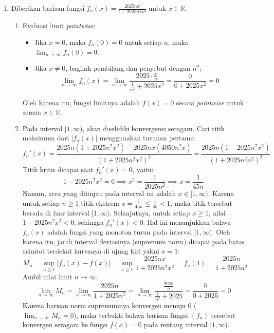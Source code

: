 \documentclass[11pt,letterpaper]{article}
\begin{document}
\begin{enumerate}
  \item Diberikan barisan fungsi $f_n(x) = \frac{2025nx}{1+2025n^2x^2}$ untuk $x \in \mathbb{R}$.
        \begin{enumerate}[label=\alph*)]
          \item Evaluasi limit \textit{pointwise}:
                \begin{itemize}
                  \item Jika $x = 0$, maka $f_n(0) = 0$ untuk setiap $n$, maka $\lim_{n \to \infty} f_n(0) = 0$.
                  \item Jika $x \neq 0$, bagilah pembilang dan penyebut dengan $n^2$:
                        \[ \lim_{n \to \infty} f_n(x) = \lim_{n \to \infty} \frac{2025 \cdot \frac{x}{n}}{\frac{1}{n^2} + 2025x^2} = \frac{0}{0 + 2025x^2} = 0 \]
                \end{itemize}
                Oleh karena itu, fungsi limitnya adalah $f(x) = 0$ secara \textit{pointwise} untuk semua $x \in \mathbb{R}$.
          \item Pada interval $[1, \infty)$, akan diselidiki konvergensi seragam.
                Cari titik maksimum dari $|f_n(x)|$ menggunakan turunan pertama:
                \[ f_n'(x) = \frac{2025n(1+2025n^2x^2) - 2025nx(4050n^2x)}{(1+2025n^2x^2)^2} = \frac{2025n(1 - 2025n^2x^2)}{(1+2025n^2x^2)^2} \]
                Titik kritis dicapai saat $f_n'(x) = 0$, yaitu:
                \[ 1 - 2025n^2x^2 = 0 \implies x^2 = \frac{1}{2025n^2} \implies x = \frac{1}{45n} \]
                Namun, area yang ditinjau pada interval ini adalah $x \in [1, \infty)$.
                Karena untuk setiap $n \ge 1$ titik ekstrem $x = \frac{1}{45n} \le \frac{1}{45} < 1$, maka titik tersebut berada di luar interval $[1, \infty)$.
                Selanjutnya, untuk setiap $x \ge 1$, nilai $1 - 2025n^2x^2 < 0$, sehingga $f_n'(x) < 0$. Hal ini menunjukkan bahwa $f_n(x)$ adalah fungsi yang monoton turun pada interval $[1, \infty)$.
                Oleh karena itu, jarak interval deviasinya (supremum norm) dicapai pada batas asimtot terdekat kurvanya di ujung kiri yakni $x = 1$:
                \[ M_n = \sup_{x \geq 1} |f_n(x) - f(x)| = \sup_{x \geq 1} \frac{2025nx}{1+2025n^2x^2} = f_n(1) = \frac{2025n}{1+2025n^2} \]
                Ambil nilai limit $n \to \infty$:
                \[ \lim_{n \to \infty} M_n = \lim_{n \to \infty} \frac{2025n}{1+2025n^2} = \lim_{n \to \infty} \frac{\frac{2025}{n}}{\frac{1}{n^2} + 2025} = \frac{0}{0 + 2025} = 0 \]
                Karena barisan norm supremumnya konvergen menuju 0 ($\lim_{n \to \infty} M_n = 0$), maka terbukti bahwa barisan fungsi $(f_n)$ tersebut konvergen seragam ke fungsi $f(x)=0$ pada rentang interval $[1,\infty)$.
        \end{enumerate}


\end{enumerate}
\end{document}
